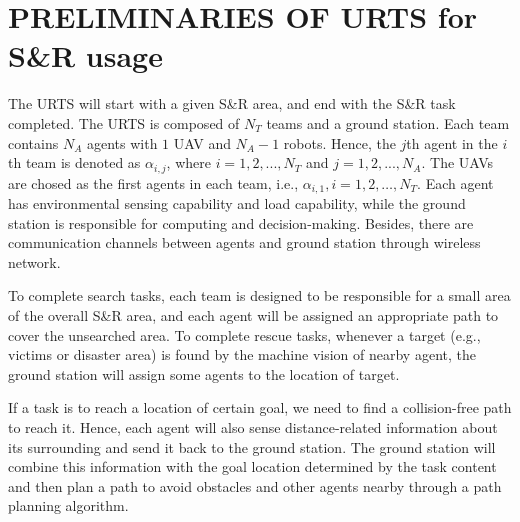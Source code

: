 \documentclass[journal,12pt,onecolumn,draftclsnofoot,]{IEEEtran}
\begin{document}
\section{PRELIMINARIES OF URTS for S\&R usage}
The URTS will start with a given S\&R area, and end with the S\&R task completed. The URTS is composed of $N_T$ teams and a ground station. Each team contains $N_A$ agents with $1$ UAV and $N_A-1$ robots. Hence, the $j$th agent in the $i$th team is denoted as $\alpha_{i,j}$, where $i=1,2,...,N_T$ and $j=1,2,...,N_A$. The UAVs are chosed as the first agents in each team, i.e., $\alpha_{i,1},i=1,2,\dots,N_T$. Each agent has environmental sensing capability and load capability, while the ground station is responsible for computing and decision-making. Besides, there are communication channels between agents and ground station through wireless network.

To complete search tasks, each team is designed to be responsible for a small area of the overall S\&R area, and each agent will be assigned an appropriate path to cover the unsearched area. To complete rescue tasks, whenever a target (e.g., victims or disaster area) is found by the machine vision of nearby agent, the ground station will assign some agents to the location of target. 

If a task is to reach a location of certain goal, we need to find a collision-free path to reach it. 
Hence, each agent will also sense distance-related information about its surrounding and send it back to the ground station. The ground station will combine this information with the goal location determined by the task content and then plan a path to avoid obstacles and other agents nearby through a path planning algorithm.
\end{document}
